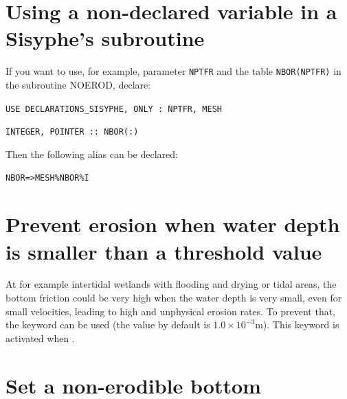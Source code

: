 \section{Using a non-declared variable in a Sisyphe's subroutine}
If you want to use, for example, parameter \texttt{NPTFR} and the table \texttt{NBOR(NPTFR)} in the subroutine NOEROD,
declare:

\texttt{USE DECLARATIONS\_SISYPHE, ONLY : NPTFR, MESH}

\texttt{INTEGER, POINTER :: NBOR(:)}

Then the following alias can be declared:

\texttt{NBOR=>MESH\%NBOR\%I}

\section{Prevent erosion when water depth is smaller than a threshold value}
At for example intertidal wetlands with flooding and drying or tidal areas, the bottom friction could be very high when the water depth is very small, even for small velocities, leading to high and unphysical erosion rates. To prevent that, the keyword  can be used (the value by default is $1.0 \times 10^{-3}$m). This keyword is activated when .

\section{Set a non-erodible bottom}

